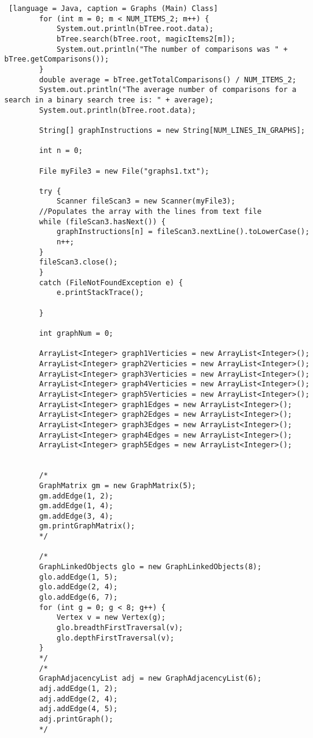 \documentclass{article}
\begin{document}
\begin{lstlisting} [language = Java, caption = Graphs (Main) Class]
        for (int m = 0; m < NUM_ITEMS_2; m++) {
            System.out.println(bTree.root.data);
            bTree.search(bTree.root, magicItems2[m]);
            System.out.println("The number of comparisons was " + bTree.getComparisons());
        }
        double average = bTree.getTotalComparisons() / NUM_ITEMS_2;
        System.out.println("The average number of comparisons for a search in a binary search tree is: " + average);
        System.out.println(bTree.root.data);
        
        String[] graphInstructions = new String[NUM_LINES_IN_GRAPHS];
        
        int n = 0;

        File myFile3 = new File("graphs1.txt");

        try {
            Scanner fileScan3 = new Scanner(myFile3);
        //Populates the array with the lines from text file
        while (fileScan3.hasNext()) {
            graphInstructions[n] = fileScan3.nextLine().toLowerCase();
            n++;
        }
        fileScan3.close();            
        }
        catch (FileNotFoundException e) {
            e.printStackTrace();

        }

        int graphNum = 0;

        ArrayList<Integer> graph1Verticies = new ArrayList<Integer>();
        ArrayList<Integer> graph2Verticies = new ArrayList<Integer>();
        ArrayList<Integer> graph3Verticies = new ArrayList<Integer>();
        ArrayList<Integer> graph4Verticies = new ArrayList<Integer>();
        ArrayList<Integer> graph5Verticies = new ArrayList<Integer>();
        ArrayList<Integer> graph1Edges = new ArrayList<Integer>();
        ArrayList<Integer> graph2Edges = new ArrayList<Integer>();
        ArrayList<Integer> graph3Edges = new ArrayList<Integer>();
        ArrayList<Integer> graph4Edges = new ArrayList<Integer>();
        ArrayList<Integer> graph5Edges = new ArrayList<Integer>();


        /*
        GraphMatrix gm = new GraphMatrix(5);
        gm.addEdge(1, 2);
        gm.addEdge(1, 4);
        gm.addEdge(3, 4);
        gm.printGraphMatrix();
        */

        /*
        GraphLinkedObjects glo = new GraphLinkedObjects(8);
        glo.addEdge(1, 5);
        glo.addEdge(2, 4);
        glo.addEdge(6, 7);
        for (int g = 0; g < 8; g++) {
            Vertex v = new Vertex(g);
            glo.breadthFirstTraversal(v);
            glo.depthFirstTraversal(v);
        }
        */
        /*
        GraphAdjacencyList adj = new GraphAdjacencyList(6);
        adj.addEdge(1, 2);
        adj.addEdge(2, 4);
        adj.addEdge(4, 5);
        adj.printGraph();
        */



\end{lstlisting}
\end{document}
